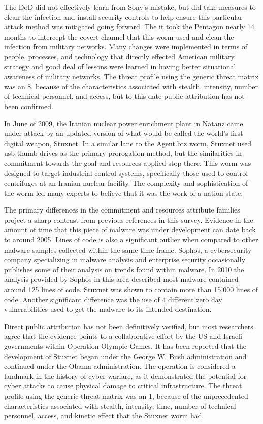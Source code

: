 \documentclass[12pt]{report}
\begin{document}
The DoD did not effectively learn from Sony’s mistake, but did take measures to clean the infection and install security controls to help ensure this particular attack method was mitigated going forward.  The it took the Pentagon nearly 14 months to intercept the covert channel that this worm used and clean the infection from military networks.  Many changes were implemented in terms of people, processes, and technology that directly effected American military strategy and good deal of lessons were learned in having better situational awareness of military networks.  The threat profile using the generic threat matrix was an 8, because of the characteristics associated with stealth, intensity, number of technical personnel, and access, but to this date public attribution has not been confirmed.  \cite{lynn2010defending}

In June of 2009, the Iranian nuclear power enrichment plant in Natanz came under attack by an updated version of what would be called the world’s first digital weapon, Stuxnet.  In a similar lane to the Agent.btz worm, Stuxnet used usb thumb drives as the primary prorogation method, but the similarities in commitment towards the goal and resources applied stop there.  \cite{zetter2014countdown}  This worm was designed to target industrial control systems, specifically those used to control centrifuges at an Iranian nuclear facility. The complexity and sophistication of the worm led many experts to believe that it was the work of a nation-state.

The primary differences in the commitment and resources attribute families project a sharp contrast from previous references in this survey.  Evidence in the amount of time that this piece of malware was under development can date back to around 2005.  Lines of code is also a significant outlier when compared to other malware samples collected within the same time frame.  Sophos, a cybersecurity company specializing in malware analysis and enterprise security occasionally publishes some of their analysis on trends found within malware.  In 2010  the analysis provided by Sophos in this area described most malware contained around 125 lines of code.  Stuxnet was shown to contain more than 15,000 lines of code.  Another significant difference was the use of 4 different zero day vulnerabilities used to get the malware to its intended destination. 

Direct public attribution has not been definitively verified, but most researchers agree that the evidence points to a collaborative effort by the US and Israeli governments within Operation Olympic Games.  It has been reported that the development of Stuxnet began under the George W. Bush administration and continued under the Obama administration.  The operation is considered a landmark in the history of cyber warfare, as it demonstrated the potential for cyber attacks to cause physical damage to critical infrastructure.  The threat profile using the generic threat matrix was an 1, because of the unprecedented characteristics associated with stealth, intensity, time, number of technical personnel, access, and kinetic effect that the Stuxnet worm had.  \cite{kaminski2020operation}
\end{document}
